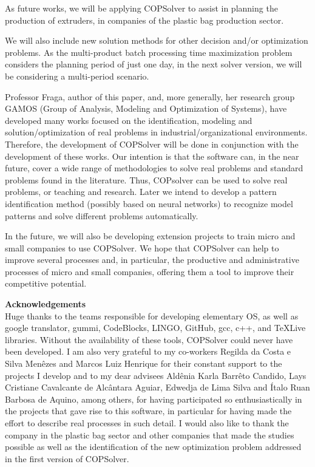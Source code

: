 \documentclass[11pt, letterpaper]{article}
\begin{document}
As future works, we will be applying COPSolver to assist in planning the production of extruders, in companies of the plastic bag production sector.

We will also include new solution methods for other decision and/or optimization problems. As the multi-product batch processing time maximization problem considers the planning period of just one day, in the next solver version, we will be considering a multi-period scenario.

Professor Fraga, author of this paper, and, more generally, her research group GAMOS (Group of Analysis, Modeling and Optimization of Systems), have developed many works focused on the identification, modeling and solution/optimization of real problems in industrial/organizational environments. Therefore, the development of COPSolver will be done in conjunction with the development of these works. Our intention is that the software can, in the near future, cover a wide range of methodologies to solve real problems and standard problems found in the literature. Thus, COPsolver can be used to solve real problems, or teaching and research. Later we intend to develop a pattern identification method (possibly based on neural networks) to recognize model patterns and solve different problems automatically.

In the future, we will also be developing extension projects to train micro and small companies to use COPSolver. We hope that COPSolver can help to improve several processes and, in particular, the productive and administrative processes of micro and small companies, offering them a tool to improve their competitive potential.

\vskip0.3cm
\noindent
\textbf{Acknowledgements}\\
Huge thanks to the teams responsible for developing elementary OS, as well as google translator, gummi, CodeBlocks, LINGO, GitHub, gcc, c++, and TeXLive libraries. Without the availability of these tools, COPSolver could never have been developed. I am also very grateful to my co-workers Regilda da Costa e Silva Menêzes and Marcos Luiz Henrique for their constant support to the projects I develop and to my dear advisees Aldênia Karla Barrêto Candido, Lays Cristiane Cavalcante de Alcântara Aguiar, Edwedja de Lima Silva and Ítalo Ruan Barbosa de Aquino, among others, for having participated so enthusiastically in the projects that gave rise to this software, in particular for having made the effort to describe real processes in such detail. I would also like to thank the company in the plastic bag sector and other companies that made the studies possible as well as the identification of the new optimization problem addressed in the first version of COPSolver. \\
\end{document}
